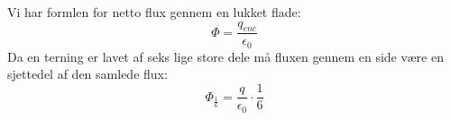 Vi har formlen for netto flux gennem en lukket flade:
\begin{equation}
	\Phi = \frac{q_{enc}}{\epsilon _0}
\end{equation}
Da en terning er lavet af seks lige store dele må fluxen gennem en side være en sjettedel af den samlede flux:
\begin{equation}
	\Phi_{\frac{1}{6}} = \frac{q}{\epsilon_0} \cdot \frac{1}{6}
\end{equation}